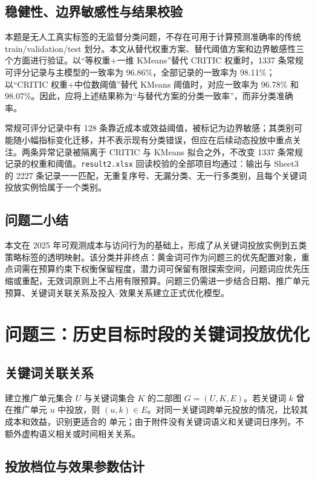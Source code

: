 \documentclass[UTF8,a4paper,zihao=-4]{ctexart}
\begin{document}
\subsection{稳健性、边界敏感性与结果校验}

本题是无人工真实标签的无监督分类问题，不存在可用于计算预测准确率的传统 train/validation/test 划分。本文从替代权重方案、替代阈值方案和边界敏感性三个方面进行验证。以“等权重+一维 KMeans”替代 CRITIC 权重时，1337 条常规可评分记录与主模型的一致率为 96.86\%，全部记录的一致率为 98.11\%；以“CRITIC 权重+中位数阈值”替代 KMeans 阈值时，对应一致率为 96.78\% 和 98.07\%。因此，应将上述结果称为“与替代方案的分类一致率”，而非分类准确率。

常规可评分记录中有 128 条靠近成本或效益阈值，被标记为边界敏感；其类别可能随小幅指标变化迁移，并不表示现有分类错误，但应在后续动态投放中重点关注。两条异常记录被隔离于 CRITIC 与 KMeans 拟合之外，不改变 1337 条常规记录的权重和阈值。\texttt{result2.xlsx} 回读校验的全部项目均通过：输出与 Sheet3 的 2227 条记录一一匹配，无重复序号、无漏分类、无一行多类别，且每个关键词投放实例恰属于一个类别。

\subsection{问题二小结}

本文在 2025 年可观测成本与访问行为的基础上，形成了从关键词投放实例到五类策略标签的透明映射。该分类并非终点：黄金词可作为问题三的优先配置对象，重点词需在预算约束下权衡保留程度，潜力词可保留有限探索空间，问题词应优先压缩或重配，无效词原则上不占用有限预算。问题三仍需进一步结合日期、推广单元预算、关键词关联关系及投入--效果关系建立正式优化模型。

\section{问题三：历史目标时段的关键词投放优化}

\subsection{关键词关联关系}

建立推广单元集合 $U$ 与关键词集合 $K$ 的二部图 $G=(U,K,E)$。若关键词 $k$ 曾在推广单元
$u$ 中投放，则 $(u,k)\in E$。对同一关键词跨单元投放的情况，比较其成本和效益，识别更适合的
单元；由于附件没有关键词语义和关键词日序列，不额外虚构语义相关或时间相关关系。

\subsection{投放档位与效果参数估计}
\end{document}
